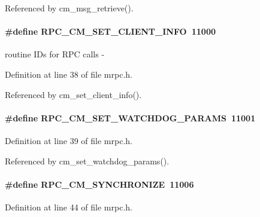 Referenced by cm\_\-msg\_\-retrieve().
\paragraph[{RPC\_\-CM\_\-SET\_\-CLIENT\_\-INFO}]{\setlength{\rightskip}{0pt plus 5cm}\#define RPC\_\-CM\_\-SET\_\-CLIENT\_\-INFO~11000}\hfill\label{group__mrpcdefineh_ga31120a65ddf8e807d5722fb30fcfb717}
routine IDs for RPC calls -\/ 

Definition at line 38 of file mrpc.h.

Referenced by cm\_\-set\_\-client\_\-info().
\paragraph[{RPC\_\-CM\_\-SET\_\-WATCHDOG\_\-PARAMS}]{\setlength{\rightskip}{0pt plus 5cm}\#define RPC\_\-CM\_\-SET\_\-WATCHDOG\_\-PARAMS~11001}\hfill\label{group__mrpcdefineh_gacf26660c68ca2cf0717213226e9048f1}

\begin{DoxyItemize}
\item 
\end{DoxyItemize}

Definition at line 39 of file mrpc.h.

Referenced by cm\_\-set\_\-watchdog\_\-params().
\paragraph[{RPC\_\-CM\_\-SYNCHRONIZE}]{\setlength{\rightskip}{0pt plus 5cm}\#define RPC\_\-CM\_\-SYNCHRONIZE~11006}\hfill\label{group__mrpcdefineh_ga24e35d6645a1fc940b10523bc4061b23}

\begin{DoxyItemize}
\item 
\end{DoxyItemize}

Definition at line 44 of file mrpc.h.

